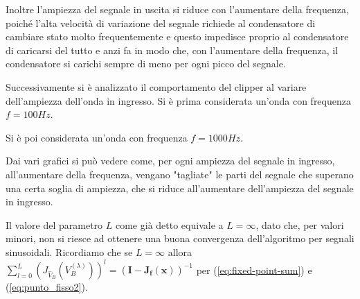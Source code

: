 				Inoltre l'ampiezza del segnale in uscita si riduce con l'aumentare della frequenza, poiché l'alta velocità di variazione del segnale richiede al condensatore di cambiare stato molto frequentemente e questo impedisce proprio al condensatore di caricarsi del tutto e anzi fa in modo che, con l'aumentare della frequenza, il condensatore si carichi sempre di meno per ogni picco del segnale.
				\pagebreak
				
				Successivamente si è analizzato il comportamento del clipper al variare dell'ampiezza dell'onda in ingresso.
				Si è prima considerata un'onda con frequenza $f = 100Hz$.
				\graficospace
				\graficospace
				\graficospace
				\graficospace
				\graficospace
				\pagebreak
				
				Si è poi considerata un'onda con frequenza $f = 1000Hz$.
				\graficospace
				\graficospace
				\graficospace
				\graficospace
				\graficospace
				\pagebreak
				
				Dai vari grafici si può vedere come, per ogni ampiezza del segnale in ingresso, all'aumentare della frequenza, vengano "tagliate" le parti del segnale che superano una certa soglia di ampiezza, che si riduce all'aumentare dell'ampiezza del segnale in ingresso.
				
				Il valore del parametro $L$ come già detto equivale a $L = \infty$, dato che, per valori minori, non si riesce ad ottenere una buona convergenza dell'algoritmo per segnali sinusoidali. Ricordiamo che se $L = \infty$ allora $\sum_{l=0}^{L} \left(J_{\widehat V_{B}}(V_{B}^{(\lambda)})\right)^{l} = (\mathbf{I}-\mathbf{J_{f}(x)})^{-1}$ per (\ref{eq:fixed-point-sum}) e (\ref{eq:punto_fisso2}).
				
